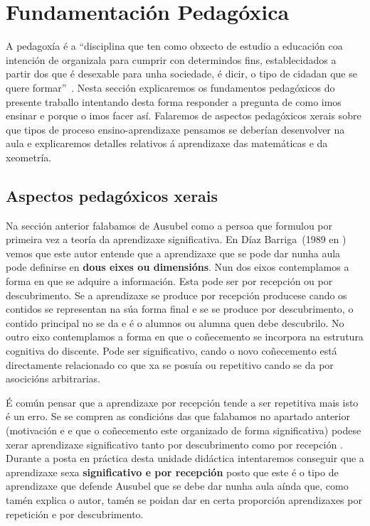 
\section{Fundamentación Pedagóxica}\label{sec:pedago}

A pedagoxía é a ``disciplina que ten como obxecto de estudio a educación coa intención de organizala para cumprir con determindos fins, establecidados a partir dos que é desexable para unha sociedade, é dicir, o tipo de cidadan que se quere formar''~\cite{wiki:pedagogia}. Nesta sección explicaremos os fundamentos pedagóxicos do presente traballo intentando desta forma responder a pregunta de como imos ensinar e porque o imos facer así. Falaremos de aspectos pedagóxicos xerais sobre que tipos de proceso ensino-aprendizaxe pensamos se deberían desenvolver na aula e explicaremos detalles relativos á aprendizaxe das matemáticas e da xeometría.

\subsection{Aspectos pedagóxicos xerais}
Na sección anterior falabamos de Ausubel como a persoa que formulou por primeira vez a teoría da aprendizaxe significativa. En Díaz Barriga~(1989 en ) vemos que este autor entende que a aprendizaxe que se pode dar nunha aula pode definirse en \textbf{dous eixes ou dimensións}. Nun dos eixos contemplamos a forma en que se adquire a información. Esta pode ser por recepción ou por descubrimento. Se a aprendizaxe se produce por recepción producese cando os contidos se representan na súa forma final e se se produce por descubrimento, o contido principal no se da e é o alumnos ou alumna quen debe descubrilo. No outro eixo contemplamos a forma en que o coñecemento se incorpora na estrutura cognitiva do discente. Pode ser significativo, cando o novo coñecemento está directamente relacionado co que xa se posuía ou repetitivo cando se da por asocicións arbitrarias.

É común pensar que a aprendizaxe por recepción tende a ser repetitiva mais isto é un erro. Se se compren as condicións das que falabamos no apartado anterior (motivación e e que o coñecemento este organizado de forma significativa) podese xerar aprendizaxe significativo tanto por descubrimento como por recepción \cite{unedpsicoedu}. Durante a posta en práctica desta unidade didáctica intentaremos conseguir que a aprendizaxe sexa \textbf{significativo e por recepción} posto que este é o tipo de aprendizaxe que defende Ausubel que se debe dar nunha aula aínda que, como tamén explica o autor, tamén se poidan dar en certa proporción aprendizaxes por repetición e por descubrimento.


